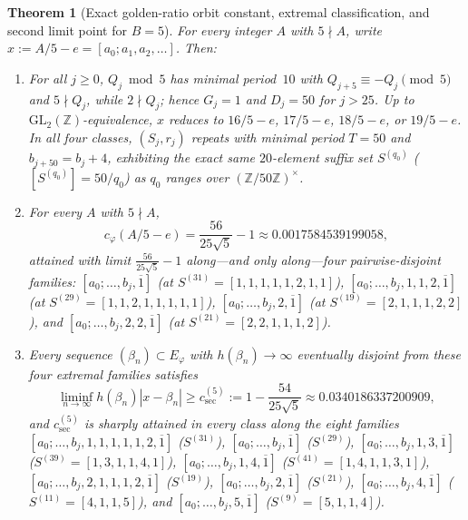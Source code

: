 \documentclass[11pt]{amsart}
\newtheorem{theorem}{Theorem}[section]
\theoremstyle{definition}
\theoremstyle{remark}
\numberwithin{equation}{section}
\newcommand{\Z}{\mathbb{Z}}
\begin{document}
\begin{theorem}[Exact golden-ratio orbit constant, extremal classification, and second limit point for $B=5$]\label{thm:golden-b5-exact}
For every integer $A$ with $5\nmid A$, write $x:=A/5-e=[a_0;a_1,a_2,\ldots]$. Then:
\begin{enumerate}
\item For all $j\ge0$, $Q_j\bmod5$ has minimal period~$10$ with $Q_{j+5}\equiv-Q_j\pmod5$
      and $5\nmid Q_j$, while $2\nmid Q_j$; hence $G_j=1$ and $D_j=50$ for $j>25$.
      Up to $\mathrm{GL}_2(\Z)$-equivalence, $x$ reduces to $16/5-e$, $17/5-e$,
      $18/5-e$, or $19/5-e$. In all four classes, $(S_j,r_j)$ repeats with
      minimal period $T=50$ and $b_{j+50}=b_j+4$, exhibiting the exact same
      $20$-element suffix set $S^{(q_0)}$ ($[S^{(q_0)}]=50/q_0$) as $q_0$ ranges
      over $(\Z/50\Z)^\times$.
\item For every $A$ with $5\nmid A$,
      \[
       c_\varphi(A/5-e)=\frac{56}{25\sqrt5}-1\approx 0.0017584539199058,
      \]
      attained with limit $\frac{56}{25\sqrt5}-1$ along---and only along---four
      pairwise-disjoint families: $[a_0;\ldots,b_j,\overline1]$ (at $S^{(31)}=[1,1,1,1,1,2,1,1]$),
      $[a_0;\ldots,b_j,1,1,2,\overline1]$ (at $S^{(29)}=[1,1,2,1,1,1,1,1]$),
      $[a_0;\ldots,b_j,2,\overline1]$ (at $S^{(19)}=[2,1,1,1,2,2]$), and
      $[a_0;\ldots,b_j,2,2,\overline1]$ (at $S^{(21)}=[2,2,1,1,1,2]$).
\item Every sequence $(\beta_n)\subset E_\varphi$ with $h(\beta_n)\to\infty$
      eventually disjoint from these four extremal families satisfies
      \[
       \liminf_{n\to\infty}h(\beta_n)|x-\beta_n|\ge
       c_{\mathrm{sec}}^{(5)}:=1-\frac{54}{25\sqrt5}\approx 0.0340186337200909,
      \]
      and $c_{\mathrm{sec}}^{(5)}$ is sharply attained in every class along
      the eight families $[a_0;\ldots,b_j,1,1,1,1,1,2,\overline1]$ ($S^{(31)}$),
      $[a_0;\ldots,b_j,\overline1]$ ($S^{(29)}$),
      $[a_0;\ldots,b_j,1,3,\overline1]$ ($S^{(39)}=[1,3,1,1,4,1]$),
      $[a_0;\ldots,b_j,1,4,\overline1]$ ($S^{(41)}=[1,4,1,1,3,1]$),
      $[a_0;\ldots,b_j,2,1,1,1,2,\overline1]$ ($S^{(19)}$),
      $[a_0;\ldots,b_j,2,\overline1]$ ($S^{(21)}$),
      $[a_0;\ldots,b_j,4,\overline1]$ ($S^{(11)}=[4,1,1,5]$), and
      $[a_0;\ldots,b_j,5,\overline1]$ ($S^{(9)}=[5,1,1,4]$).
\end{enumerate}
\end{theorem}
\end{document}
